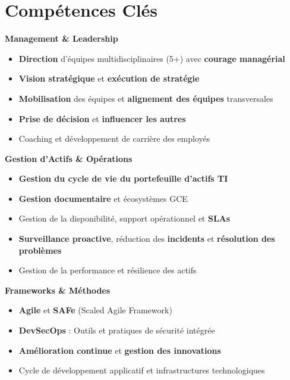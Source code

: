 \documentclass[11pt,a4paper]{article}
\newcommand{\highlight}[1]{\textcolor{primaryblue}{\textbf{#1}}}
\newcommand{\skilltitle}[1]{\normalsize\textcolor{primaryblue}{\textbf{#1}}}
\begin{document}
\section*{Compétences Clés}

\begin{minipage}[t]{0.55\textwidth}
\skilltitle{Management \& Leadership}
\begin{itemize}[leftmargin=10pt]
    \item \highlight{Direction} d'équipes multidisciplinaires (5+) avec \highlight{courage managérial}
    \item \highlight{Vision stratégique} et \highlight{exécution de stratégie}
    \item \highlight{Mobilisation} des équipes et \highlight{alignement des équipes} transversales
    \item \highlight{Prise de décision} et \highlight{influencer les autres}
    \item Coaching et développement de carrière des employés
\end{itemize}

\skilltitle{Gestion d'Actifs \& Opérations}
\begin{itemize}[leftmargin=10pt]
    \item \highlight{Gestion du cycle de vie du portefeuille d'actifs TI}
    \item \highlight{Gestion documentaire} et écosystèmes GCE
    \item Gestion de la disponibilité, support opérationnel et \highlight{SLAs}
    \item \highlight{Surveillance proactive}, réduction des \highlight{incidents} et \highlight{résolution des problèmes}
    \item Gestion de la performance et résilience des actifs
\end{itemize}

\skilltitle{Frameworks \& Méthodes}
\begin{itemize}[leftmargin=10pt]
    \item \highlight{Agile} et \highlight{SAFe} (Scaled Agile Framework)
    \item \highlight{DevSecOps} : Outils et pratiques de sécurité intégrée
    \item \highlight{Amélioration continue} et \highlight{gestion des innovations}
    \item Cycle de développement applicatif et infrastructures technologiques
\end{itemize}
\end{minipage}
\end{document}

